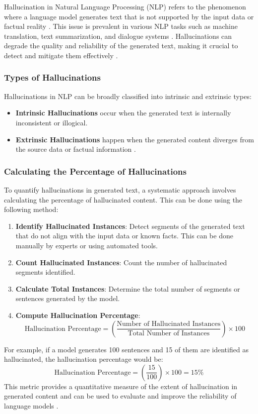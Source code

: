 Hallucination in Natural Language Processing (NLP) refers to the phenomenon where a language model generates text that is not supported by the input data or factual reality \cite{venkit2024confidently}. This issue is prevalent in various NLP tasks such as machine translation, text summarization, and dialogue systems \cite{agrawal2024language}. Hallucinations can degrade the quality and reliability of the generated text, making it crucial to detect and mitigate them effectively \cite{Ji2022Survey}.

\subsubsection*{Types of Hallucinations}

Hallucinations in NLP can be broadly classified into intrinsic and extrinsic types:
\begin{itemize}
    \item \textbf{Intrinsic Hallucinations} occur when the generated text is internally inconsistent or illogical.
    \item \textbf{Extrinsic Hallucinations} happen when the generated content diverges from the source data or factual information \cite{Huang2023A}.
\end{itemize}

\subsubsection*{Calculating the Percentage of Hallucinations}

To quantify hallucinations in generated text, a systematic approach involves calculating the percentage of hallucinated content. This can be done using the following method:
\begin{enumerate}
    \item \textbf{Identify Hallucinated Instances}: Detect segments of the generated text that do not align with the input data or known facts. This can be done manually by experts or using automated tools.
    \item \textbf{Count Hallucinated Instances}: Count the number of hallucinated segments identified.
    \item \textbf{Calculate Total Instances}: Determine the total number of segments or sentences generated by the model.
    \item \textbf{Compute Hallucination Percentage}:
    \[
    \text{Hallucination Percentage} = \left( \frac{\text{Number of Hallucinated Instances}}{\text{Total Number of Instances}} \right) \times 100
    \]
\end{enumerate}
For example, if a model generates 100 sentences and 15 of them are identified as hallucinated, the hallucination percentage would be:
\[
\text{Hallucination Percentage} = \left( \frac{15}{100} \right) \times 100 = 15\%
\]
This metric provides a quantitative measure of the extent of hallucination in generated content and can be used to evaluate and improve the reliability of language models \cite{Xiao2021On}.
